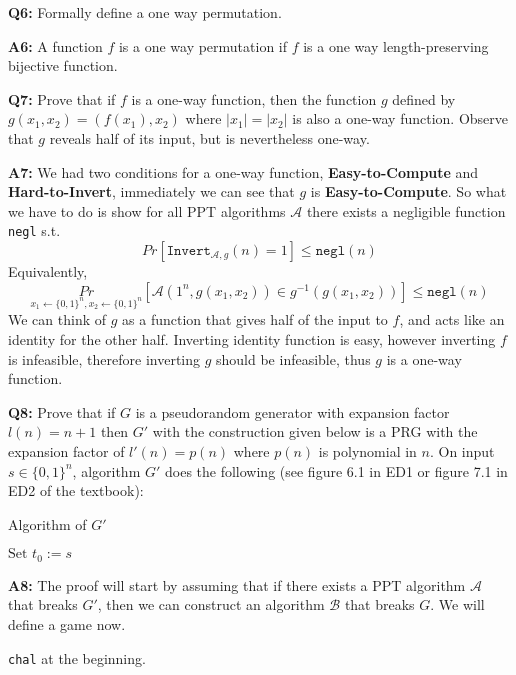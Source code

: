 \documentclass[12pt,reqno]{amsart}
\newcommand{\code}[1]{\texttt{#1}}
\newcommand{\advrs}[0]{\mathcal{A}}
\begin{document}
\vspace{20px}
\textbf{Q6:} Formally define a one way permutation.

\textbf{A6:} A function $f$ is a one way permutation if $f$ is a one way length-preserving bijective function.

\vspace{20px}
\textbf{Q7:} Prove that if $f$ is a one-way function, then the function $g$ defined by $g(x_1, x_2) = (f(x_1), x_2)$ where $|x_1|=|x_2|$ is also a one-way function. Observe that $g$ reveals half of its input, but is nevertheless one-way.

\textbf{A7:} We had two conditions for a one-way function, \textbf{Easy-to-Compute} and \textbf{Hard-to-Invert}, immediately we can see that $g$ is \textbf{Easy-to-Compute}. So what we have to do is show for all PPT algorithms $\advrs$ there exists a negligible function \code{negl} s.t.
$$
Pr[\code{Invert}_{\advrs,g}(n)=1] \leq \code{negl}(n)
$$
Equivalently, 
$$
\underset{x_1 \xleftarrow{} \{0,1\}^n, x_2 \xleftarrow{} \{0,1\}^n}{Pr}[\advrs(1^n, g(x_1,x_2)) \in g^{-1}(g(x_1,x_2))] \leq \code{negl}(n)
$$
We can think of $g$ as a function that gives half of the input to $f$, and acts like an identity for the other half. Inverting identity function is easy, however inverting $f$ is infeasible, therefore inverting $g$ should be infeasible, thus $g$ is a one-way function.

\vspace{20px}
\textbf{Q8:} Prove that if $G$ is a pseudorandom generator with expansion factor $l(n)=n+1$ then $G'$ with the construction given below is a PRG with the expansion factor of $l'(n)=p(n)$ where $p(n)$ is polynomial in $n$.
On input $s \in \{0,1\}^n$, algorithm $G'$ does the following (see figure 6.1 in ED1 or figure 7.1 in ED2 of the textbook):
\begin{algorithm}
\caption{Algorithm of $G'$}
\label{alg:q8}
\begin{algorithmic}[1]
\STATE $\text{Set } t_0 := s$
\ENDFOR
{}
\end{algorithmic}
\end{algorithm}

\textbf{A8:} The proof will start by assuming that if there exists a PPT algorithm $\advrs$ that breaks $G'$, then we can construct an algorithm $\mathcal{B}$ that breaks $G$. We will define a game now.
\begin{algorithm}
\caption{\code{chal} at the beginning.}
\label{alg:q8proofc1}
\begin{algorithmic}[1]
\STATE{\code{Chal} chooses a bit $b \gets \{R, PR\}$}
\ELSE
\ENDIF
\STATE{\code{Chal} gives $1^n$ and $r$ to $\mathcal{B}$}
\end{algorithmic}
\end{algorithm}
\end{document}
